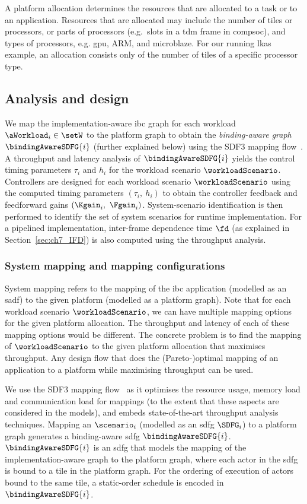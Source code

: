 A platform allocation determines the resources that are allocated to a task or to an application. 
Resources that are allocated may include the number of tiles or processors, or parts of processors (e.g.\ slots in a \gls{tdm} frame in \gls{compsoc}), and types of processors, e.g. \gls{gpu}, ARM, and microblaze. For our running \gls{lkas} example, an allocation consists only of the number of tiles of a specific processor type. 

\subsection{Analysis and design}
We map the implementation-aware \gls{ibc} graph for each workload $\aWorkload_i\in \setW$ to the platform graph to obtain the \emph{binding-aware graph} $\bindingAwareSDFG{i}$ (further explained below) using the SDF3 mapping flow~\cite{stuijk2007}. 
A throughput and latency analysis of $\bindingAwareSDFG{i}$ yields the control timing parameters $\tau_i$ and $h_i$ for the workload scenario $\workloadScenario$. Controllers are designed for each workload scenario $\workloadScenario$ using the computed timing parameters $(\tau_i,\ h_i)$ to obtain the controller feedback and feedforward gains $(\Kgain_i,\ \Fgain_i)$. System-scenario identification is then performed to identify the set of system scenarios for runtime implementation. 
For a pipelined implementation, inter-frame dependence time $\fd$ (as explained in Section~\ref{sec:ch7_IFD}) is also computed using the throughput analysis.

\subsubsection{System mapping and mapping configurations}
System mapping refers to the mapping of the \gls{ibc} application (modelled as an \gls{sadf}) to the given platform (modelled as a platform graph). 
Note that for each workload scenario $\workloadScenario$, we can have multiple mapping options for the given platform allocation. 
The throughput and latency of each of these mapping options would be different.
The concrete problem is to find the mapping of $\workloadScenario$ to the given platform allocation that maximises throughput.
Any design flow that does the (Pareto-)optimal mapping of an application to a platform while maximising throughput can be used. 

We use the SDF3 mapping flow~\cite{stuijk2006sdf} as it optimises the resource usage, memory load and communication load for mappings (to the extent that these aspects are considered in the models), and embeds state-of-the-art throughput analysis techniques.
Mapping an $\scenario_i$ (modelled as an \gls{sdfg} $\SDFG_i$) to a platform graph generates a binding-aware \gls{sdfg} $\bindingAwareSDFG{i}$.
$\bindingAwareSDFG{i}$ is an \gls{sdfg} that models the mapping of the implementation-aware graph to the platform graph, where each actor in the \gls{sdfg} is bound to a tile in the platform graph. For the ordering of execution of actors bound to the same tile, a static-order schedule is encoded in $\bindingAwareSDFG{i}$.

